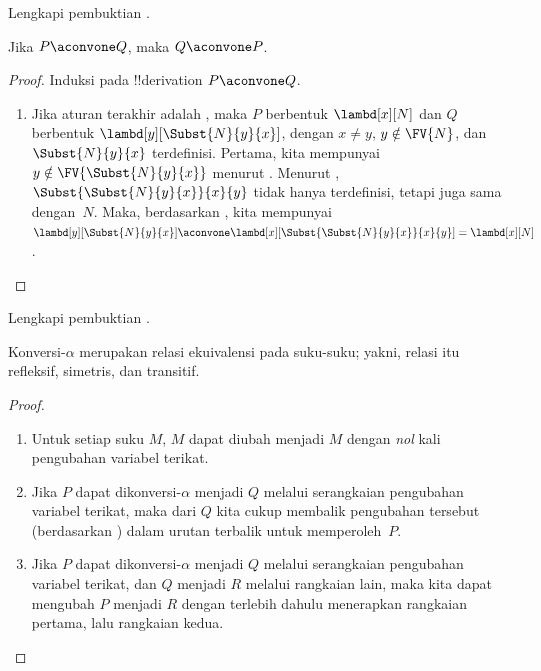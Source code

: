 \documentclass[../../../include/open-logic-section]{subfiles}
\begin{document}
\begin{prob}
  Lengkapi pembuktian .
\end{prob}

\begin{lem}
  Jika $P \aconvone Q$, maka $Q \aconvone P$.
\end{lem}

\begin{proof}
  Induksi pada !!{derivation} $P \aconvone Q$.
  \begin{enumerate}
  \item Jika aturan terakhir adalah , maka $P$
    berbentuk $\lambd[x][N]$ dan $Q$ berbentuk
    $\lambd[y][\Subst{N}{y}{x}]$, dengan $x \neq y$, $y \notin \FV{N}$,
    dan $\Subst{N}{y}{x}$ terdefinisi. Pertama, kita mempunyai $y \notin
    \FV{\Subst{N}{y}{x}}$ menurut . Menurut
    , $\Subst{\Subst{N}{y}{x}}{x}{y}$ tidak hanya
    terdefinisi, tetapi juga sama dengan~$N$. Maka, berdasarkan
    , kita mempunyai
    $\lambd[y][\Subst{N}{y}{x}] \aconvone
    \lambd[x][\Subst{\Subst{N}{y}{x}}{x}{y}] = \lambd[x][N]$.
  \end{enumerate}
\end{proof}

\begin{prob}
  Lengkapi pembuktian .
\end{prob}

\begin{thm}
  Konversi-$\alpha$ merupakan relasi ekuivalensi pada suku-suku; yakni, relasi
  itu refleksif, simetris, dan transitif.
\end{thm}

\begin{proof}
  \begin{enumerate}
  \item Untuk setiap suku $M$, $M$ dapat diubah menjadi $M$ dengan
    \emph{nol} kali pengubahan variabel terikat.
  \item Jika $P$ dapat dikonversi-$\alpha$ menjadi $Q$ melalui serangkaian
    pengubahan variabel terikat, maka dari $Q$ kita cukup membalik pengubahan
    tersebut (berdasarkan ) dalam urutan terbalik untuk
    memperoleh~$P$.
  \item Jika $P$ dapat dikonversi-$\alpha$ menjadi $Q$ melalui serangkaian
    pengubahan variabel terikat, dan $Q$ menjadi $R$ melalui rangkaian lain,
    maka kita dapat mengubah $P$ menjadi $R$ dengan terlebih dahulu menerapkan
    rangkaian pertama, lalu rangkaian kedua.
  \end{enumerate}
\end{proof}
\end{document}
